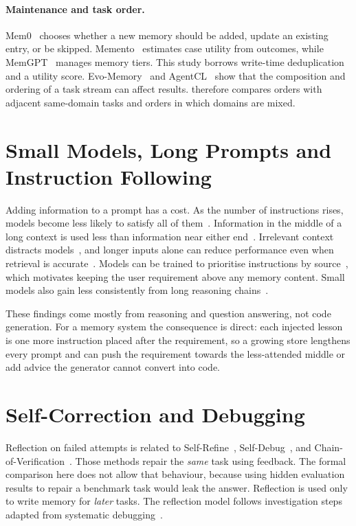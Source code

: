 \paragraph{Maintenance and task order.} Mem0~\cite{chhikara2025mem0} chooses whether a new memory should be added, update an existing entry, or be skipped. Memento~\cite{zhou2025memento} estimates case utility from outcomes, while MemGPT~\cite{packer2023memgpt} manages memory tiers. This study borrows write-time deduplication and a utility score. Evo-Memory~\cite{wei2025evomemory} and AgentCL~\cite{shu2026agentcl} show that the composition and ordering of a task stream can affect results.  therefore compares orders with adjacent same-domain tasks and orders in which domains are mixed.

\section{Small Models, Long Prompts and Instruction Following}
\label{sec:bg-small}
Adding information to a prompt has a cost. As the number of instructions rises, models become less likely to satisfy all of them~\cite{harada2025curse,jaroslawicz2025ifscale}. Information in the middle of a long context is used less than information near either end~\cite{liu2024lost}. Irrelevant context distracts models~\cite{shi2023distracted}, and longer inputs alone can reduce performance even when retrieval is accurate~\cite{du2025contextlength}. Models can be trained to prioritise instructions by source~\cite{wallace2024hierarchy}, which motivates keeping the user requirement above any memory content. Small models also gain less consistently from long reasoning chains~\cite{li2025smallmodels}.

These findings come mostly from reasoning and question answering, not code generation. For a memory system the consequence is direct: each injected lesson is one more instruction placed after the requirement, so a growing store lengthens every prompt and can push the requirement towards the less-attended middle or add advice the generator cannot convert into code.

\section{Self-Correction and Debugging}
\label{sec:bg-selfcorr}
Reflection on failed attempts is related to Self-Refine~\cite{madaan2023selfrefine}, Self-Debug~\cite{chen2023selfdebug}, and Chain-of-Verification~\cite{dhuliawala2023cove}. Those methods repair the \emph{same} task using feedback. The formal comparison here does not allow that behaviour, because using hidden evaluation results to repair a benchmark task would leak the answer. Reflection is used only to write memory for \emph{later} tasks. The reflection model follows investigation steps adapted from systematic debugging~\cite{zeller2009whyprograms}.

